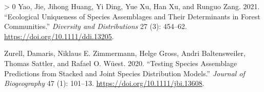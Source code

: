 \documentclass[11pt]{article}
\newlength{\cslhangindent}
\newenvironment{CSLReferences}[3] %
 {%
  \setlength{\parindent}{0pt}
  \ifodd #1 \everypar{\setlength{\hangindent}{\cslhangindent}}\ignorespaces\fi
  \ifnum #2 > 0
  \setlength{\parskip}{#2\baselineskip}
  \fi
 }%
 {}
\begin{document}
\begin{CSLReferences}{1}{0}
\leavevmode\hypertarget{ref-Yao2021EcoUni}{}%
Yao, Jie, Jihong Huang, Yi Ding, Yue Xu, Han Xu, and Runguo Zang. 2021.
{``Ecological Uniqueness of Species Assemblages and Their Determinants
in Forest Communities.''} \emph{Diversity and Distributions} 27 (3):
454--62. \url{https://doi.org/10.1111/ddi.13205}.

\leavevmode\hypertarget{ref-Zurell2020TesSpe}{}%
Zurell, Damaris, Niklaus E. Zimmermann, Helge Gross, Andri
Baltensweiler, Thomas Sattler, and Rafael O. Wüest. 2020. {``Testing
Species Assemblage Predictions from Stacked and Joint Species
Distribution Models.''} \emph{Journal of Biogeography} 47 (1): 101--13.
\url{https://doi.org/10.1111/jbi.13608}.

\end{CSLReferences}
\end{document}
